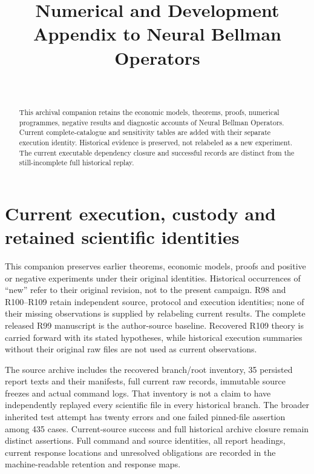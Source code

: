 \documentclass[ecta,nameyear,draft]{econsocart}
\begin{document}
\begin{frontmatter}
\title{Numerical and Development Appendix to Neural Bellman Operators}
\begin{aug}
\author[id=au1,addressref={add1}]{~}
\address[id=add1]{Peking University}
\end{aug}
\begin{abstract}This archival companion retains the economic models, theorems, proofs, numerical programmes, negative results and diagnostic accounts of Neural Bellman Operators. Current complete-catalogue and sensitivity tables are added with their separate execution identity. Historical evidence is preserved, not relabeled as a new experiment. The current executable dependency closure and successful records are distinct from the still-incomplete full historical replay.\end{abstract}
\end{frontmatter}
\appendix
\renewcommand{\thetheorem}{A.\arabic{theorem}}
\renewcommand{\theequation}{A.\arabic{equation}}
\renewcommand{\thesection}{\AlphAlph{\value{section}}}
\section{Current execution, custody and retained scientific identities}\label{dev:custody110}
This companion preserves earlier theorems, economic models, proofs and positive or negative experiments under their original identities. Historical occurrences of ``new'' refer to their original revision, not to the present campaign. R98 and R100--R109 retain independent source, protocol and execution identities; none of their missing observations is supplied by relabeling current results. The complete released R99 manuscript is the author-source baseline. Recovered R109 theory is carried forward with its stated hypotheses, while historical execution summaries without their original raw files are not used as current observations.

The source archive includes the recovered branch/root inventory, 35 persisted report texts and their manifests, full current raw records, immutable source freezes and actual command logs. That inventory is not a claim to have independently replayed every scientific file in every historical branch. The broader inherited test attempt has twenty errors and one failed pinned-file assertion among 435 cases. Current-source success and full historical archive closure remain distinct assertions. Full command and source identities, all report headings, current response locations and unresolved obligations are recorded in the machine-readable retention and response maps.

\end{document}
